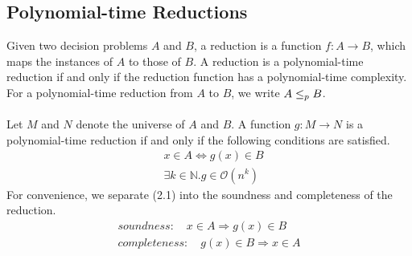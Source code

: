 \subsection*{Polynomial-time Reductions}
Given two decision problems $A$ and $B$, 
a reduction is a function $f: A \rightarrow B$, 
which maps the instances of $A$ to those of $B$. A reduction is a polynomial-time reduction
if and only if the reduction function has a polynomial-time complexity. 
For a polynomial-time reduction from $A$ to $B$, we write $A \leq_p B$. \\ \\
Let $M$ and $N$ denote the universe of $A$ and $B$. 
A function $g: M \rightarrow N$ is a polynomial-time reduction 
if and only if the following conditions are satisfied.
\begin{align*}  
    &x \in A \iff g(x) \in B \\
    &\exists k\in \mathbb{N}. g \in \mathcal{O}(n^k)
\end{align*}
For convenience, we separate (2.1) into the soundness and completeness of the reduction.
\begin{align*}
    soundness: \quad x \in A \Longrightarrow g(x) \in B \\
    completeness: \quad g(x) \in B \Longrightarrow x \in A
\end{align*}


